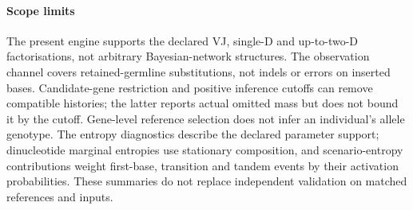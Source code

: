 \documentclass[11pt]{article}
\theoremstyle{oldplain}
\theoremstyle{oldrem}
\begin{document}
\paragraph{Scope limits} The present engine supports the declared VJ, single-D and
up-to-two-D factorisations, not arbitrary Bayesian-network structures.
The observation channel covers retained-germline substitutions, not indels or
errors on inserted bases.
Candidate-gene restriction and positive inference cutoffs can remove compatible
histories; the latter reports actual omitted mass but does not bound it by the cutoff.
Gene-level reference selection does not infer an individual's allele genotype.
The entropy diagnostics describe the declared parameter support; dinucleotide
marginal entropies use stationary composition, and scenario-entropy contributions
weight first-base, transition and tandem events by their activation probabilities.
These summaries do not replace independent validation on matched references and inputs.

\clearpage


\end{document}
